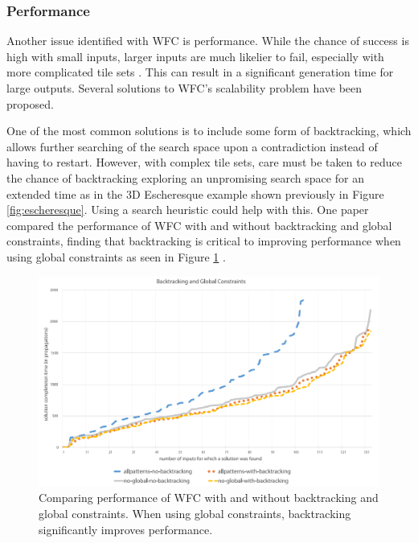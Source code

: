 
\subsubsection{Performance}\label{sec:performance}
Another issue identified with WFC is performance. While the chance of success is high with small inputs, larger inputs are much likelier to fail, especially with more complicated tile sets \cite{WFC_ConstraintSolving_and_ML}. This can result in a significant generation time for large outputs. Several solutions to WFC's scalability problem have been proposed.%

One of the most common solutions is to include some form of backtracking, which allows further searching of the search space upon a contradiction instead of having to restart. However, with complex tile sets, care must be taken to reduce the chance of backtracking exploring an unpromising search space for an extended time as in the 3D Escheresque example shown previously in Figure \ref{fig:escheresque}. Using a search heuristic could help with this. One paper compared the performance of WFC with and without backtracking and global constraints, finding that backtracking is critical to improving performance when using global constraints as seen in Figure \ref{fig:backtrackingPerformance} \cite{WFC_ConstraintSolving_and_ML}.

\begin{figure}[H]
    \centering
    \includegraphics[width=\textwidth, height=0.3\textheight, keepaspectratio]{Images/BacktrackingPerformance.png}
    \caption{Comparing performance of WFC with and without backtracking and global constraints. When using global constraints, backtracking significantly improves performance. \cite{WFC_ConstraintSolving_and_ML}}
    \label{fig:backtrackingPerformance}
\end{figure}

